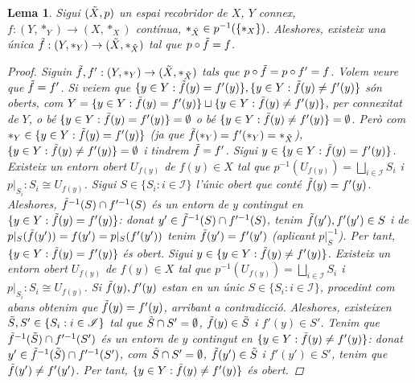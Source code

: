 \documentclass[compress,10pt]{article}
\newtheorem{lema}{Lema}[section]
\theoremstyle{definition}
\begin{document}
\begin{lema}
    Sigui $(\Tilde{X},p)$ un espai recobridor de $X$, $Y$ connex, $f:(Y,*_{Y})\rightarrow(X,*_{X})$ contínua, $*_{\Tilde{X}}\in p^{-1}(\{*_{X}\})$. Aleshores, existeix una única $\Tilde{f}:(Y,*_{Y})\rightarrow(\Tilde{X},*_{\Tilde{X}})$ tal que $p\circ\Tilde{f}=f$.
    \begin{center}
    \end{center}
    \begin{proof}
        Siguin $\Tilde{f},f':(Y,*_{Y})\rightarrow(\Tilde{X},*_{\Tilde{X}})$ tals que $p\circ\Tilde{f}=p\circ f'=f$. Volem veure que $\Tilde{f}=f'$. Si veiem que $\{y\in Y:\Tilde{f}(y)=f'(y)\},\{y\in Y:\Tilde{f}(y)\neq f'(y)\}$ són oberts, com $Y=\{y\in Y:\Tilde{f}(y)=f'(y)\}\sqcup\{y\in Y:\Tilde{f}(y)\neq f'(y)\}$, per connexitat de $Y$, o bé $\{y\in Y:\Tilde{f}(y)=f'(y)\}=\emptyset$ o bé $\{y\in Y:\Tilde{f}(y)\neq f'(y)\}=\emptyset$. Però com $*_{Y}\in\{y\in Y:\Tilde{f}(y)=f'(y)\}$ (ja que $\Tilde{f}(*_{Y})=f'(*_{Y})=*_{\Tilde{X}}$), $\{y\in Y:\Tilde{f}(y)\neq f'(y)\}=\emptyset$ i tindrem $\Tilde{f}=f'$.\newline
        Sigui $y\in\{y\in Y:\Tilde{f}(y)=f'(y)\}$. Existeix un entorn obert $U_{f(y)}$ de $f(y)\in X$ tal que $p^{-1}(U_{f(y)})=\bigsqcup_{i\in\mathscr{I}}S_{i}$ i $p|_{S_{i}}:S_{i}\cong U_{f(y)}$. Sigui $S\in\{S_{i}:i\in\mathscr{I}\}$ l'únic obert que conté $\Tilde{f}(y)=f'(y)$. Aleshores, $\Tilde{f}^{-1}(S)\cap f'^{-1}(S)$ és un entorn de $y$ contingut en $\{y\in Y:\Tilde{f}(y)=f'(y)\}$: donat $y'\in\Tilde{f}^{-1}(S)\cap f'^{-1}(S)$, tenim $\Tilde{f}(y'),f'(y')\in S$ i de $p|_{S}(\Tilde{f}(y'))=f(y')=p|_{S}(f'(y'))$ tenim $\Tilde{f}(y')=f'(y')$ (aplicant $p|_{S}^{-1}$). Per tant, $\{y\in Y:\Tilde{f}(y)=f'(y)\}$ és obert.\newline
        Sigui $y\in\{y\in Y:\Tilde{f}(y)\neq f'(y)\}$. Existeix un entorn obert $U_{f(y)}$ de $f(y)\in X$ tal que $p^{-1}(U_{f(y)})=\bigsqcup_{i\in\mathscr{I}}S_{i}$ i $p|_{S_{i}}:S_{i}\cong U_{f(y)}$. Si $\Tilde{f}(y),f'(y)$ estan en un únic $S\in\{S_{i}:i\in\mathscr{I}\}$, procedint com abans obtenim que $\Tilde{f}(y)=f'(y)$, arribant a contradicció. Aleshores, existeixen $\Tilde{S},S'\in\{S_{i}:i\in\mathscr{I}\}$ tal que $\Tilde{S}\cap S'=\emptyset$, $\Tilde{f}(y)\in\Tilde{S}$ i $f'(y)\in S'$. Tenim que $\Tilde{f}^{-1}(\Tilde{S})\cap f'^{-1}(S')$ és un entorn de $y$ contingut en $\{y\in Y:\Tilde{f}(y)\neq f'(y)\}$: donat $y'\in\Tilde{f}^{-1}(\Tilde{S})\cap f'^{-1}(S')$, com $\Tilde{S}\cap S'=\emptyset$, $\Tilde{f}(y')\in\Tilde{S}$ i $f'(y')\in S'$, tenim que $\Tilde{f}(y')\neq f'(y')$. Per tant, $\{y\in Y:\Tilde{f}(y)\neq f'(y)\}$ és obert.
    \end{proof}
\end{lema}
\end{document}
